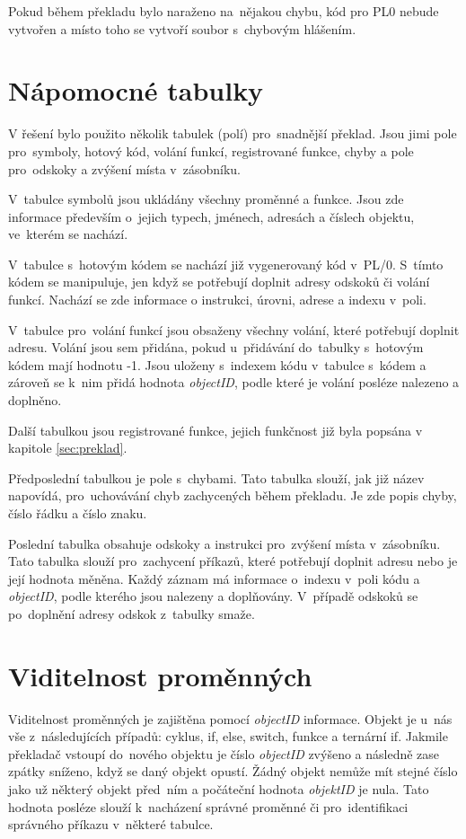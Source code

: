 \documentclass[czech]{thesiskiv}
\begin{document}
Pokud během překladu bylo naraženo na~nějakou chybu, kód pro PL0 nebude vytvořen a 
místo toho se vytvoří soubor s~chybovým hlášením.

\section{Nápomocné tabulky}
V řešení bylo použito několik tabulek (polí) pro~snadnější překlad. 
Jsou jimi pole pro~symboly, hotový kód, volání funkcí, registrované funkce, 
chyby a pole pro~odskoky a zvýšení místa v~zásobníku. 


V~tabulce symbolů jsou ukládány všechny proměnné a funkce. Jsou zde informace 
především o~jejich typech, jménech, adresách a číslech objektu, ve~kterém se nachází.  


V~tabulce s~hotovým kódem se nachází již vygenerovaný kód v~PL/0. 
S~tímto kódem se manipuluje, jen když se potřebují doplnit adresy odskoků či volání funkcí.
Nachází se zde informace o instrukci, úrovni, adrese a indexu v~poli. 


V~tabulce pro~volání funkcí jsou obsaženy všechny volání, které potřebují doplnit adresu. 
Volání jsou sem přidána, pokud u~přidávání do~tabulky s~hotovým kódem mají hodnotu -1. 
Jsou uloženy s~indexem kódu v~tabulce s~kódem a zároveň se k~nim přidá hodnota \textit{objectID}, 
podle které je volání posléze nalezeno a doplněno.


Další tabulkou jsou registrované funkce, jejich funkčnost již byla popsána v kapitole \ref{sec:preklad}. 


Předposlední tabulkou je pole s~chybami. Tato tabulka slouží, jak již název napovídá, 
pro~uchovávání chyb zachycených během překladu. Je zde popis chyby, číslo řádku a číslo znaku.


Poslední tabulka obsahuje odskoky a instrukci pro~zvýšení místa v~zásobníku. 
Tato tabulka slouží pro~zachycení příkazů, které potřebují doplnit adresu nebo je její hodnota měněna. 
Každý záznam má informace o~indexu v~poli kódu a \textit{objectID}, podle kterého jsou nalezeny a doplňovány. 
V~případě odskoků se po~doplnění adresy odskok z~tabulky smaže. 

\section{Viditelnost proměnných}
Viditelnost proměnných je zajištěna pomocí \textit{objectID} informace. 
Objekt je u~nás vše z~následujících případů: cyklus, if, else, switch, funkce a ternární if. 
Jakmile překladač vstoupí do~nového objektu je číslo \textit{objectID} zvýšeno a následně zase zpátky sníženo, když se daný objekt opustí. 
Žádný objekt nemůže mít stejné číslo jako už některý objekt před~ním a počáteční hodnota \textit{objektID} je nula. 
Tato hodnota posléze slouží k~nacházení správné proměnné či pro~identifikaci správného příkazu v~některé tabulce.
\end{document}
